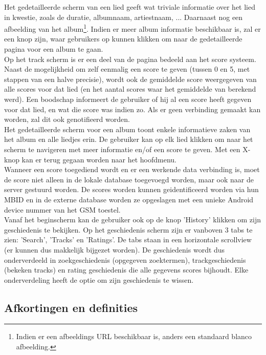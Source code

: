 \documentclass[11pt,a4paper]{article}
\begin{document}
Het gedetailleerde scherm van een lied geeft wat triviale informatie over het lied in kwestie, zoals de duratie, albumnaam, artiestnaam, ... Daarnaast nog een afbeelding van het album\footnote{Indien er een afbeeldings URL beschikbaar is, anders een standaard blanco afbeelding.}. Indien er meer album informatie beschikbaar is, zal er een knop zijn, waar gebruikers op kunnen klikken om naar de gedetailleerde pagina voor een album te gaan. 
\\ 	
Op het track scherm is er een deel van de pagina bedeeld aan het score systeem. Naast de mogelijkheid om zelf eenmalig een score te geven (tussen 0 en 5, met stappen van een halve precisie), wordt ook de gemiddelde score weergegeven van alle scores voor dat lied (en het aantal scores waar het gemiddelde van berekend werd). Een boodschap informeert de gebruiker of hij al een score heeft gegeven voor dat lied, en wat die score was indien zo. Als er geen verbinding gemaakt kan worden, zal dit ook genotifieerd worden. 
\\ 
	
Het gedetailleerde scherm voor een album toont enkele informatieve zaken van het album en alle liedjes erin. De gebruiker kan op elk lied klikken om naar het scherm te navigeren met meer informatie en/of een score te geven. Met een X-knop kan er terug gegaan worden naar het hoofdmenu.
\\ 
	
Wanneer een score toegediend wordt en er een werkende data verbinding is, moet de score niet alleen in de lokale database toegevoegd worden, maar ook naar de server gestuurd worden. De scores worden kunnen geidentificeerd worden via hun MBID en in de externe database worden ze opgeslagen met een unieke Android device nummer van het GSM toestel. 
\\
Vanaf het beginscherm kan de gebruiker ook op de knop 'History' klikken om zijn geschiedenis te bekijken. Op het geschiedenis scherm zijn er vanboven 3 tabs te zien: 'Search', 'Tracks' en 'Ratings'.  De tabs staan in een horizontale scrollview (er kunnen dus makkelijk bijgezet worden). De geschiedenis wordt dus onderverdeeld in zoekgeschiedenis (opgegeven zoektermen), trackgeschiedenis (bekeken tracks) en rating geschiedenis die alle gegevens scores bijhoudt. Elke onderverdeling heeft de optie om zijn geschiedenis te wissen.
	
	
	\subsection{Afkortingen en definities}
\end{document}
